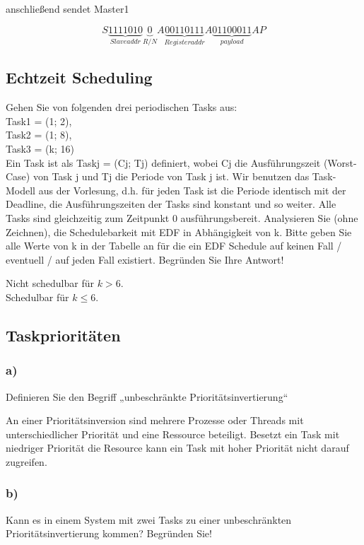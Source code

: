 anschließend sendet Master1

\begin{equation}
  S\underbrace{1111010}_{Slave addr}\underbrace{0}_{R/N}A\underbrace{00110111}_{Register addr}A\underbrace{0110 0011}_{payload}AP
\end{equation}

\subsection{Echtzeit Scheduling}
Gehen Sie von folgenden drei periodischen Tasks aus:\\
Task1 = (1; 2),\\
Task2 = (1; 8),\\
Task3 = (k; 16)\\
Ein Task ist als Taskj = (Cj; Tj) definiert, wobei Cj die Ausführungszeit (Worst-Case) von Task j und Tj die
Periode von Task j ist. Wir benutzen das Task-Modell aus der Vorlesung, d.h. für jeden Task ist die Periode
identisch mit der Deadline, die Ausführungszeiten der Tasks sind konstant und so weiter. Alle Tasks sind
gleichzeitig zum Zeitpunkt 0 ausführungsbereit.
Analysieren Sie (ohne Zeichnen), die Schedulebarkeit mit EDF in Abhängigkeit von k. Bitte geben Sie alle
Werte von k in der Tabelle an für die ein EDF Schedule auf keinen Fall / eventuell / auf jeden Fall existiert.
Begründen Sie Ihre Antwort!

Nicht schedulbar für $k>6$.\\
Schedulbar für $k \leq 6$.

\subsection{Taskprioritäten}
\subsubsection{a)}
Definieren Sie den Begriff „unbeschränkte Prioritätsinvertierung“

An einer Prioritätsinversion sind mehrere Prozesse oder Threads mit unterschiedlicher Priorität und eine Ressource beteiligt. Besetzt ein
Task mit niedriger Priorität die Resource kann ein Task mit hoher Priorität nicht darauf zugreifen. 
\subsubsection{b)}
Kann es in einem System mit zwei Tasks zu einer unbeschränkten Prioritätsinvertierung kommen?
Begründen Sie!

